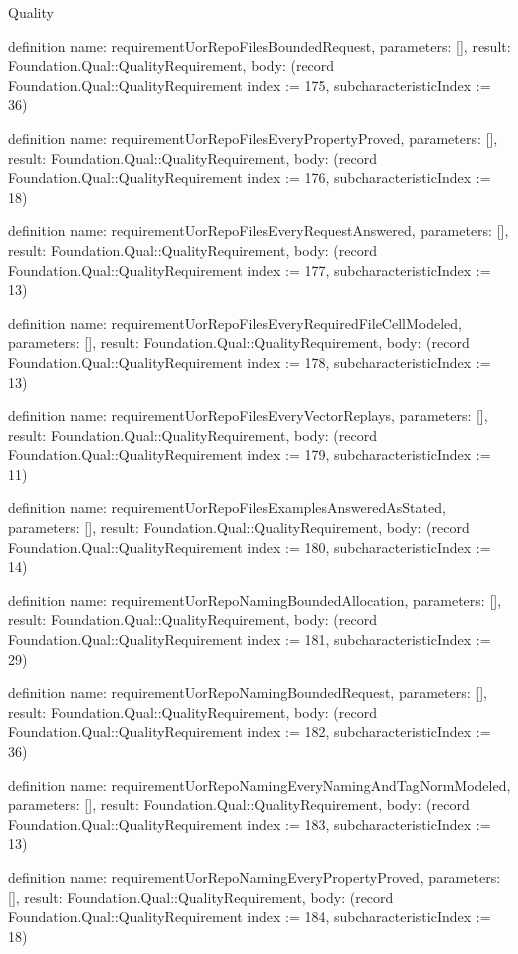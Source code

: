 \begin{lexlean}{Quality}
\begin{semanticmodule}
definition{
  name: requirementUorRepoFilesBoundedRequest,
  parameters: [],
  result: Foundation.Qual::QualityRequirement,
  body: (record Foundation.Qual::QualityRequirement {index := 175, subcharacteristicIndex := 36})
}

definition{
  name: requirementUorRepoFilesEveryPropertyProved,
  parameters: [],
  result: Foundation.Qual::QualityRequirement,
  body: (record Foundation.Qual::QualityRequirement {index := 176, subcharacteristicIndex := 18})
}

definition{
  name: requirementUorRepoFilesEveryRequestAnswered,
  parameters: [],
  result: Foundation.Qual::QualityRequirement,
  body: (record Foundation.Qual::QualityRequirement {index := 177, subcharacteristicIndex := 13})
}

definition{
  name: requirementUorRepoFilesEveryRequiredFileCellModeled,
  parameters: [],
  result: Foundation.Qual::QualityRequirement,
  body: (record Foundation.Qual::QualityRequirement {index := 178, subcharacteristicIndex := 13})
}

definition{
  name: requirementUorRepoFilesEveryVectorReplays,
  parameters: [],
  result: Foundation.Qual::QualityRequirement,
  body: (record Foundation.Qual::QualityRequirement {index := 179, subcharacteristicIndex := 11})
}

definition{
  name: requirementUorRepoFilesExamplesAnsweredAsStated,
  parameters: [],
  result: Foundation.Qual::QualityRequirement,
  body: (record Foundation.Qual::QualityRequirement {index := 180, subcharacteristicIndex := 14})
}

definition{
  name: requirementUorRepoNamingBoundedAllocation,
  parameters: [],
  result: Foundation.Qual::QualityRequirement,
  body: (record Foundation.Qual::QualityRequirement {index := 181, subcharacteristicIndex := 29})
}

definition{
  name: requirementUorRepoNamingBoundedRequest,
  parameters: [],
  result: Foundation.Qual::QualityRequirement,
  body: (record Foundation.Qual::QualityRequirement {index := 182, subcharacteristicIndex := 36})
}

definition{
  name: requirementUorRepoNamingEveryNamingAndTagNormModeled,
  parameters: [],
  result: Foundation.Qual::QualityRequirement,
  body: (record Foundation.Qual::QualityRequirement {index := 183, subcharacteristicIndex := 13})
}

definition{
  name: requirementUorRepoNamingEveryPropertyProved,
  parameters: [],
  result: Foundation.Qual::QualityRequirement,
  body: (record Foundation.Qual::QualityRequirement {index := 184, subcharacteristicIndex := 18})
}


\end{semanticmodule}
\end{lexlean}
